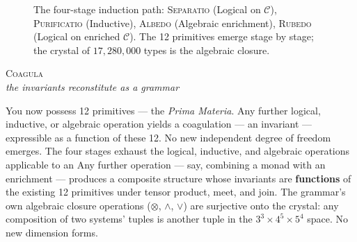 \documentclass[12pt,a4paper]{article}
\makeatletter
\renewcommand{\_}{\ig@origunderscore\discretionary{}{}{}}
\makeatother
\begin{document}
\begin{figure}[htbp]
{
}

\caption{The four-stage induction path: \textsc{Separatio} (Logical on $\mathcal{C}$), \textsc{Purificatio} (Inductive), \textsc{Albedo} (Algebraic enrichment), \textsc{Rubedo} (Logical on enriched $\mathcal{C}$). The 12 primitives emerge stage by stage; the crystal of $17{,}280{,}000$ types is the algebraic closure.}
\label{fig:induction-path}
\end{figure}

\begin{center}
\vspace{0.6em}
{\large\textsc{Coagula}}\\[4pt]
{\small\itshape the invariants reconstitute as a grammar}
\vspace{0.4em}
\end{center}

You now possess 12 primitives --- the \emph{Prima Materia}. Any further logical, inductive, or algebraic operation
yields a coagulation --- an invariant --- expressible as a function of these 12. No new independent degree of freedom
emerges. The four stages exhaust the logical, inductive, and algebraic operations applicable to an
Any further operation --- say, combining a monad with an enrichment --- produces a composite structure whose invariants
are \textbf{functions} of the existing 12 primitives under tensor product, meet, and join. The grammar's own algebraic
closure operations ($\otimes$, $\wedge$, $\vee$) are surjective onto the crystal: any composition of two systems'
tuples is another tuple in the $3^3 \times 4^5 \times 5^4$ space. No new dimension forms.
\end{document}
